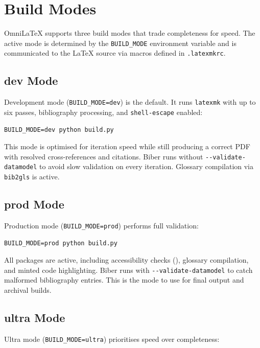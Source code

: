 \chapter{Build Modes}
\label{ch:buildmodes}

OmniLaTeX supports three build modes that trade completeness for speed.
The active mode is determined by the \texttt{BUILD\_MODE} environment
variable and is communicated to the \LaTeX{} source via macros defined
in \texttt{.latexmkrc}.

\section{dev Mode}

Development mode (\texttt{BUILD\_MODE=dev}) is the default.  It runs
\texttt{latexmk} with up to six passes, bibliography processing, and
\texttt{shell-escape} enabled:

\begin{verbatim}
BUILD_MODE=dev python build.py
\end{verbatim}

This mode is optimised for iteration speed while still producing a correct
PDF with resolved cross-references and citations.  Biber runs without
\texttt{-{}-validate-datamodel} to avoid slow validation on every
iteration.  Glossary compilation via \texttt{bib2gls} is active.

\section{prod Mode}

Production mode (\texttt{BUILD\_MODE=prod}) performs full validation:

\begin{verbatim}
BUILD_MODE=prod python build.py
\end{verbatim}

All packages are active, including accessibility checks (),
glossary compilation, and minted code highlighting.  Biber runs with
\texttt{-{}-validate-datamodel} to catch malformed bibliography entries.
This is the mode to use for final output and archival builds.

\section{ultra Mode}

Ultra mode (\texttt{BUILD\_MODE=ultra}) prioritises speed over completeness:

